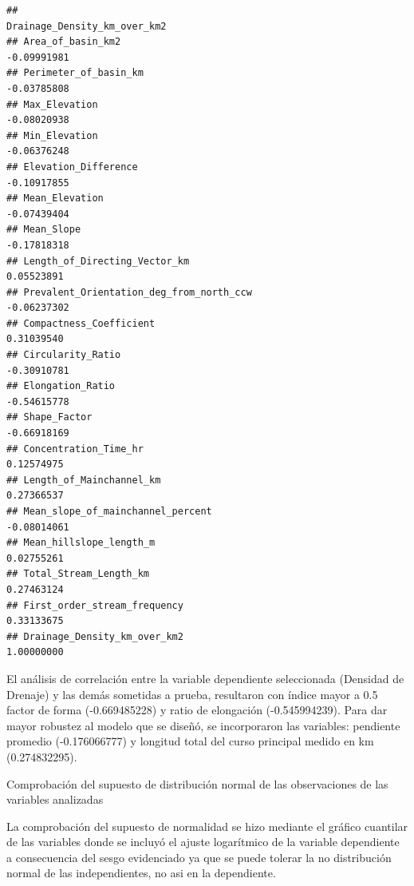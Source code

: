 \documentclass[11pt,]{article}
\begin{document}
\begin{verbatim}
##                                          Drainage_Density_km_over_km2
## Area_of_basin_km2                                         -0.09991981
## Perimeter_of_basin_km                                     -0.03785808
## Max_Elevation                                             -0.08020938
## Min_Elevation                                             -0.06376248
## Elevation_Difference                                      -0.10917855
## Mean_Elevation                                            -0.07439404
## Mean_Slope                                                -0.17818318
## Length_of_Directing_Vector_km                              0.05523891
## Prevalent_Orientation_deg_from_north_ccw                  -0.06237302
## Compactness_Coefficient                                    0.31039540
## Circularity_Ratio                                         -0.30910781
## Elongation_Ratio                                          -0.54615778
## Shape_Factor                                              -0.66918169
## Concentration_Time_hr                                      0.12574975
## Length_of_Mainchannel_km                                   0.27366537
## Mean_slope_of_mainchannel_percent                         -0.08014061
## Mean_hillslope_length_m                                    0.02755261
## Total_Stream_Length_km                                     0.27463124
## First_order_stream_frequency                               0.33133675
## Drainage_Density_km_over_km2                               1.00000000
\end{verbatim}

El análisis de correlación entre la variable dependiente seleccionada
(Densidad de Drenaje) y las demás sometidas a prueba, resultaron con
índice mayor a 0.5 factor de forma (-0.669485228) y ratio de elongación
(-0.545994239). Para dar mayor robustez al modelo que se diseñó, se
incorporaron las variables: pendiente promedio (-0.176066777) y longitud
total del curso principal medido en km (0.274832295).

Comprobación del supuesto de distribución normal de las observaciones de
las variables analizadas

La comprobación del supuesto de normalidad se hizo mediante el gráfico
cuantilar de las variables donde se incluyó el ajuste logarítmico de la
variable dependiente a consecuencia del sesgo evidenciado ya que se
puede tolerar la no distribución normal de las independientes, no asi en
la dependiente.
\end{document}
